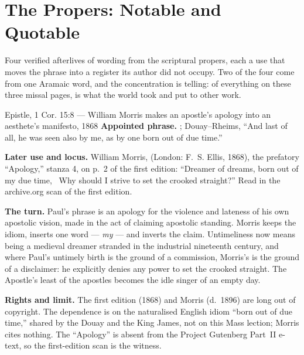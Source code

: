 \sectionguard
\section*{The Propers: Notable and Quotable}

Four verified afterlives of wording from the scriptural propers, each a use
that moves the phrase into a register its author did not occupy. Two of the
four come from
one Aramaic word, and the concentration is telling: of everything on these
three missal pages,
 is what the world took and put to other work.

\begin{afterlife}{Epistle, 1 Cor. 15:8 --- William Morris makes an apostle's apology into an aesthete's manifesto, 1868}
\textbf{Appointed phrase.} ; Douay--Rheims, ``And last of all, he was seen also by me, as by
one born out of due time.''

\textbf{Later use and locus.} William Morris, 
(London: F.~S. Ellis, 1868), the prefatory ``Apology,'' stanza 4, on p.~2 of the
first edition: ``Dreamer of dreams, born out of my due time, \textbar\ Why
should I strive to set the crooked straight?'' Read in the archive.org scan of
the first edition.

\textbf{The turn.} Paul's phrase is an apology for the violence and lateness of
his own apostolic vision, made in the act of claiming apostolic standing.
Morris keeps the idiom, inserts one word --- \textit{my} --- and inverts the
claim. Untimeliness now means being a medieval dreamer stranded in the
industrial nineteenth century, and where Paul's untimely birth is the ground of
a commission, Morris's is the ground of a disclaimer: he explicitly denies any
power to set the crooked straight. The Apostle's least of the apostles becomes
the idle singer of an empty day.

\textbf{Rights and limit.} The first edition (1868) and Morris (d.~1896) are
long out of copyright. The dependence is on the naturalised English idiom
``born out of due time,'' shared by the Douay and the King James, not on this
Mass lection; Morris cites nothing. The ``Apology'' is absent from the Project
Gutenberg Part~II e-text, so the first-edition scan is the witness.
\end{afterlife}

